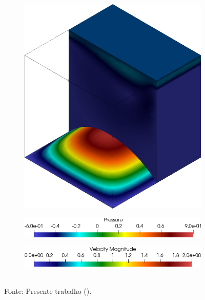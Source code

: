 \begin{figure}[h!]
\begin{subfigure}[b]{0.23\textwidth}
    \end{subfigure}
    \begin{subfigure}[b]{0.23\textwidth}
        \includegraphics[width=\linewidth]{Figuras/FSI-Cavity3D/u24-3.png}
    \end{subfigure}
    \caption*{$t=24,3$}
    \begin{subfigure}[b]{0.35\textwidth}
        \includegraphics[width=\linewidth]{Figuras/FSI-Cavity3D/lp.png}
    \end{subfigure}
    \begin{subfigure}[b]{0.35\textwidth}
        \includegraphics[width=\linewidth]{Figuras/FSI-Cavity3D/lu.png}
    \end{subfigure}
    \\Fonte: Presente trabalho (\the\year).
    \label{fig:Cavity3D-press}
\end{figure}

